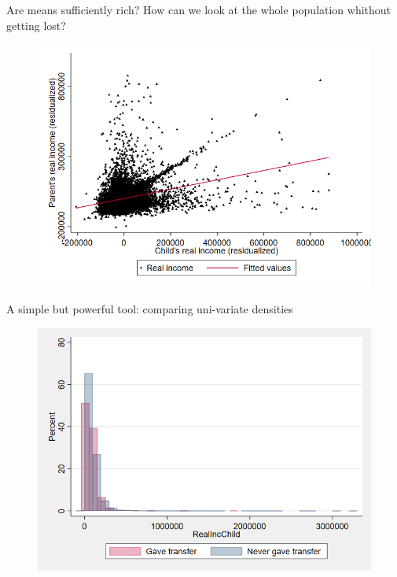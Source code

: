 \documentclass[10pt]{beamer}
\begin{document}
\begin{frame}{Are means sufficiently rich? How can we look at the whole population whithout getting lost?}

\begin{figure}[h!]
  \includegraphics[width=.8\textwidth]{LineFitScatter_Residuals.png}
\end{figure}%
    
\end{frame}

\begin{frame}{A simple but powerful tool: comparing uni-variate densities}

\begin{figure}[h!]
  \includegraphics[width=.8\textwidth]{Hist1.png}
\end{figure}%
    
\end{frame}
\end{document}
